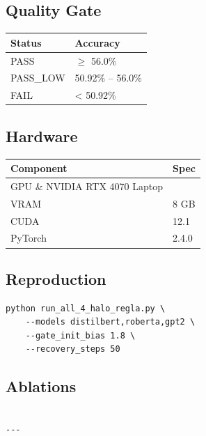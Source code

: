 \subsection{Quality Gate}

\begin{table}[H]
\centering
\small
\begin{tabular}{ll}
\toprule
\textbf{Status} & \textbf{Accuracy} \\
\midrule
PASS & $\ge$ 56.0\% \\
PASS\_LOW & 50.92\% -- 56.0\% \\
FAIL & < 50.92\% \\
\bottomrule
\end{tabular}
\end{table}

\subsection{Hardware}

\begin{table}[H]
\centering
\small
\begin{tabular}{ll}
\toprule
\textbf{Component} & \textbf{Spec} \\
\midrule
GPU \& NVIDIA RTX 4070 Laptop \\
VRAM & 8 GB \\
CUDA & 12.1 \\
PyTorch & 2.4.0 \\
\bottomrule
\end{tabular}
\end{table}

\subsection{Reproduction}

\begin{lstlisting}
python run_all_4_halo_regla.py \
    --models distilbert,roberta,gpt2 \
    --gate_init_bias 1.8 \
    --recovery_steps 50
\end{lstlisting}

\subsection{Ablations}

\begin{lstlisting}

---
\end{lstlisting}


